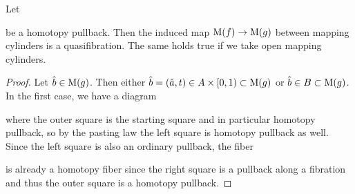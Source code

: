 \begin{lemma}\label{lem:mapOfCylIsQuasiFib} %
    Let 
    \begin{center}
    \end{center}
    be a homotopy pullback.
    Then the induced map $\operatorname{M}(f)\to\operatorname{M}(g)$ between mapping cylinders is a quasifibration. %
    The same holds true if we take open mapping cylinders.
    \begin{proof}
        Let $\hat{b}\in\operatorname{M}(g)$. 
        Then either $\hat{b}=(\hat{a},t)\in A\times[0,1)\subset\operatorname{M}(g)$ or $\hat{b}\in B\subset\operatorname{M}(g)$.
        In the first case, we have a diagram
        \begin{center}
        \end{center}
        where the outer square is the starting square and in particular homotopy pullback, so by the pasting law the left square is homotopy pullback as well.
        Since the left square is also an ordinary pullback, the fiber  
        \begin{center}
        \end{center}
        is already a homotopy fiber since the right square is a pullback along a fibration and thus the outer square is a homotopy pullback.


\end{proof}
\end{lemma}
